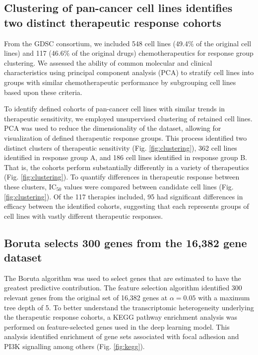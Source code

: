 \documentclass[10pt, letterpaper]{article}
\begin{document}
\begin{multicols*}{2}
\subsection{Clustering of pan-cancer cell lines identifies two distinct therapeutic response cohorts}
From the GDSC consortium, we included 548 cell lines (49.4\% of the original cell lines) and 117 (46.6\% of the original drugs) chemotherapeutics for response group clustering. We assessed the ability of common molecular and clinical characteristics using principal component analysis (PCA) to stratify cell lines into groups with similar chemotherapeutic performance by subgrouping cell lines based upon these criteria.

To identify defined cohorts of pan-cancer cell lines with similar trends in therapeutic sensitivity, we employed unsupervised clustering of retained cell lines. PCA was used to reduce the dimensionality of the dataset, allowing for visualization of defined therapeutic response groups. This process identified two distinct clusters of therapeutic sensitivity (Fig. \ref{fig:clustering}), 362 cell lines identified in response group A, and 186 cell lines identified in response group B. That is, the cohorts perform substantially differently in a variety of therapeutics (Fig. \ref{fig:clustering}). To quantify differences in therapeutic response between these clusters, IC$_50$ values were compared between candidate cell lines (Fig. \ref{fig:clustering}). Of the 117 therapies included, 95 had significant differences in efficacy between the identified cohorts, suggesting that each represents groups of cell lines with vastly different therapeutic responses.


\subsection{Boruta selects 300 genes from the 16,382 gene dataset}
The Boruta algorithm was used to select genes that are estimated to have the greatest predictive contribution. The feature selection algorithm identified 300 relevant genes from the original set of 16,382 genes at $\alpha=0.05$ with a maximum tree depth of 5. To better understand the transcriptomic heterogeneity underlying the therapeutic response cohorts, a KEGG pathway enrichment analysis was performed on feature-selected genes used in the deep learning model. This analysis identified enrichment of gene sets associated with focal adhesion and PI3K signalling among others (Fig. \ref{fig:kegg}).



\end{multicols*}
\end{document}
